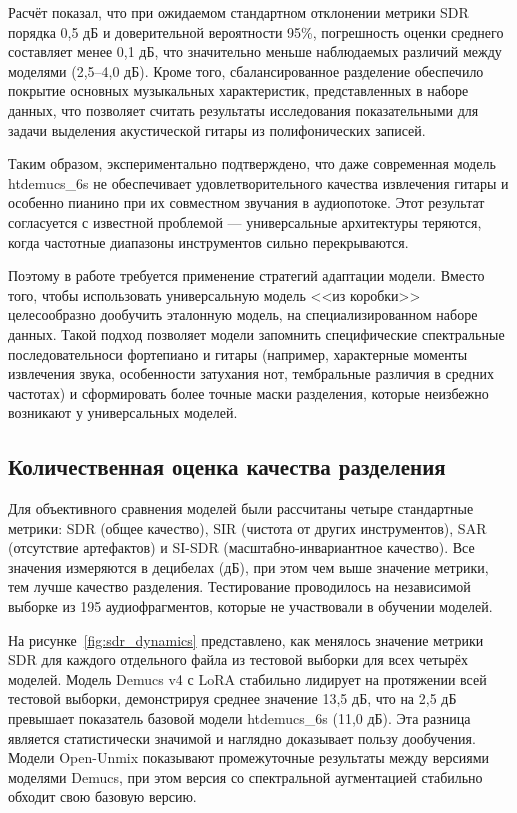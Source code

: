 \documentclass[14pt]{extarticle}
\begin{document}
Расчёт показал, что при ожидаемом стандартном отклонении метрики SDR порядка 0,5 дБ и доверительной вероятности 95\%, 
погрешность оценки среднего составляет менее 0,1 дБ, что значительно меньше наблюдаемых различий между моделями (2,5--4,0 дБ). 
Кроме того, сбалансированное разделение обеспечило покрытие основных музыкальных характеристик, 
представленных в наборе данных, что позволяет считать результаты исследования показательными для задачи выделения 
акустической гитары из полифонических записей.

Таким образом, экспериментально подтверждено, что даже современная модель htdemucs\_6s не обеспечивает 
удовлетворительного качества извлечения гитары и особенно пианино при их совместном звучания в аудиопотоке. 
Этот результат согласуется с известной проблемой --- универсальные архитектуры теряются, когда частотные диапазоны инструментов 
сильно перекрываются.

Поэтому в работе требуется применение стратегий адаптации модели. Вместо того, чтобы использовать универсальную модель 
<<из коробки>> целесообразно дообучить эталонную модель, на специализированном наборе данных.
Такой подход позволяет модели запомнить специфические спектральные последовательноси фортепиано и гитары (например, характерные 
моменты извлечения звука, особенности затухания нот, тембральные различия в средних частотах) и сформировать более точные маски 
разделения, которые неизбежно возникают у универсальных моделей.

\subsection{Количественная оценка качества разделения}

Для объективного сравнения моделей были рассчитаны четыре стандартные метрики: SDR (общее качество), SIR (чистота от других инструментов), 
SAR (отсутствие артефактов) и SI-SDR (масштабно-инвариантное качество). 
Все значения измеряются в децибелах (дБ), при этом чем выше значение метрики, тем лучше качество разделения. 
Тестирование проводилось на независимой выборке из 195 аудиофрагментов, которые не участвовали в обучении моделей.

На рисунке~\ref{fig:sdr_dynamics} представлено, как менялось значение метрики SDR для каждого отдельного файла из тестовой выборки для всех четырёх 
моделей. 
Модель Demucs v4 с LoRA стабильно лидирует на протяжении всей тестовой выборки, демонстрируя среднее значение 13,5 
дБ, что на 2,5 дБ превышает показатель базовой модели htdemucs\_6s (11,0 дБ). 
Эта разница является статистически значимой и наглядно доказывает пользу дообучения.
Модели Open-Unmix показывают промежуточные результаты между версиями моделями Demucs, при этом версия 
со спектральной аугментацией стабильно обходит свою базовую версию.
\end{document}
